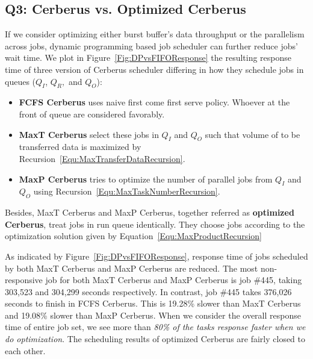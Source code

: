 \subsection{Q3: Cerberus vs. Optimized Cerberus}
If we consider optimizing either burst buffer's data throughput or the parallelism across jobs,
dynamic programming based job scheduler can further reduce jobs' wait time.
We plot in Figure~\ref{Fig:DPvsFIFOResponse} the resulting response time of
three version of Cerberus scheduler differing in
how they schedule jobs in queues ($Q_I$, $Q_R,$ and $Q_O$):
\begin{itemize}
        \item \textbf{FCFS Cerberus} uses naive first come first serve policy.
                Whoever at the front of queue are considered favorably.
        \item \textbf{MaxT Cerberus} select these jobs in $Q_I$ and $Q_O$
                such that volume of to be transferred data
                is maximized by Recursion~\ref{Equ:MaxTransferDataRecursion}.
        \item \textbf{MaxP Cerberus} tries to optimize
                the number of parallel jobs from $Q_I$ and $Q_O$
                using Recursion~\ref{Equ:MaxTaskNumberRecursion}.
\end{itemize}
Besides, MaxT Cerberus and MaxP Cerberus, together referred as \textbf{optimized Cerberus},
treat jobs in run queue identically.
They choose jobs according to the optimization solution
given by Equation~\ref{Equ:MaxProductRecursion}

As indicated by Figure~\ref{Fig:DPvsFIFOResponse}, response time of
jobs scheduled by both MaxT Cerberus and MaxP Cerberus are reduced.
The most non-responsive job for both MaxT Cerberus and MaxP Cerberus is job \#445,
taking 303,523 and 304,299 seconds respectively.
In contrast, job \#445 takes 376,026 seconds to finish in FCFS Cerberus.
This is 19.28\% slower than MaxT Cerberus and 19.08\% slower than MaxP Cerberus.
When we consider the overall response time of entire job set,
we see more than \textit{80\% of the tasks response faster when we do optimization}.
The scheduling results of optimized Cerberus are fairly closed to each other.

